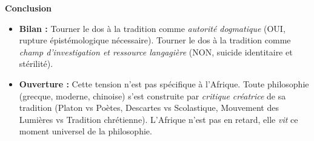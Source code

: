 \documentclass[11pt]{article}
\begin{document}
\begin{exoresolu}
\textbf{Conclusion}
\begin{itemize}
    \item \textbf{Bilan :} Tourner le dos à la tradition comme \emph{autorité dogmatique} (OUI, rupture épistémologique nécessaire). Tourner le dos à la tradition comme \emph{champ d'investigation et ressource langagière} (NON, suicide identitaire et stérilité).
    \item \textbf{Ouverture :} Cette tension n'est pas spécifique à l'Afrique. Toute philosophie (grecque, moderne, chinoise) s'est construite par \emph{critique créatrice} de sa tradition (Platon vs Poètes, Descartes vs Scolastique, Mouvement des Lumières vs Tradition chrétienne). L'Afrique n'est pas en retard, elle \emph{vit} ce moment universel de la philosophie.
\end{itemize}
\end{exoresolu}
\end{document}
